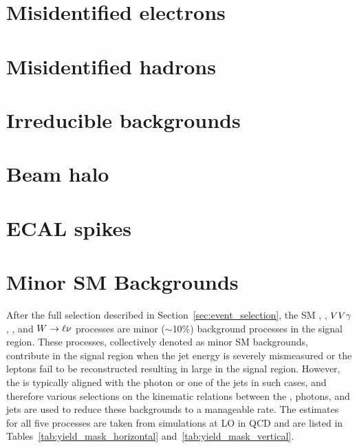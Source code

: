 \section{Misidentified electrons}
\label{sec:efake}



\section{Misidentified hadrons}
\label{sec:hfake}



\section{Irreducible backgrounds}
\label{sec:irreducible}



\section{Beam halo}
\label{sec:halo_estimate}



\section{ECAL spikes}
\label{sec:spike_estimate}



\section{Minor SM Backgrounds}
\label{sec:minorsm}

After the full selection described in Section~\ref{sec:event_selection}, the SM \gj, \ttg, $VV\gamma$, \zllg, and ${W}\to\ell\nu$ processes are minor ($\sim$10\%) background processes in the signal region. 
These processes, collectively denoted as minor SM backgrounds, contribute in the signal region when the jet energy is severely mismeasured or the leptons fail to be reconstructed resulting in large \met in the signal region. 
However, the \met is typically aligned with the photon or one of the jets in such cases, and therefore various selections on the kinematic relations between the \met, photons, and jets are used to reduce these backgrounds to a manageable rate. 
The estimates for all five processes are taken from \MGvATNLO simulations at LO in QCD and are listed in Tables~\ref{tab:yield_mask_horizontal} and~\ref{tab:yield_mask_vertical}.

